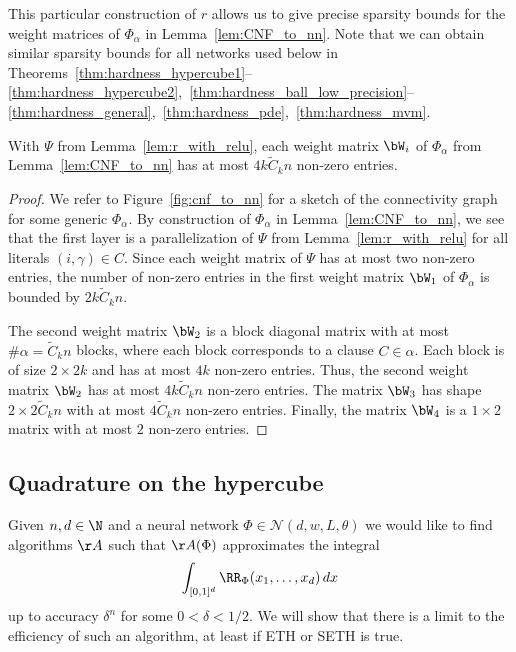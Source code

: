 \documentclass{amsart}[11pt]
\numberwithin{equation}{section}
\newcommand{\nn}{\mathcal{N}}
\newcommand{\card}{\#}
\numberwithin{theorem}{section}
\begin{document}
This particular construction of $r$ allows us to give precise sparsity bounds for the weight matrices of $\Phi_\alpha$ in Lemma~\ref{lem:CNF_to_nn}.
Note that we can obtain similar sparsity bounds for all networks used below in Theorems~\ref{thm:hardness_hypercube1}--\ref{thm:hardness_hypercube2},~\ref{thm:hardness_ball_low_precision}--\ref{thm:hardness_general},~\ref{thm:hardness_pde},~\ref{thm:hardness_mvm}.
\begin{proposition}\label{prop:sparsity}
With $\Psi$ from Lemma~\ref{lem:r_with_relu}, each weight matrix $\bW_i$ of $\Phi_\alpha$ from Lemma~\ref{lem:CNF_to_nn} has at most $4k \widetilde C_k n$ non-zero entries.
\end{proposition}
\begin{proof}
    We refer to Figure~\ref{fig:cnf_to_nn} for a sketch of the connectivity graph for some generic $\Phi_\alpha$.
By construction of $\Phi_\alpha$ in Lemma~\ref{lem:CNF_to_nn}, we see that the first layer is a parallelization of $\Psi$ from Lemma~\ref{lem:r_with_relu} for all literals $(i, \gamma) \in C$. Since each weight matrix of $\Psi$ has at most two non-zero entries, the number of non-zero entries in the first weight matrix $\bW_1$ of $\Phi_\alpha$ is bounded by $2k \widetilde{C}_k n$. 

The second weight matrix $\bW_2$ is a block diagonal matrix with at most $\card \alpha = \widetilde C_k n$ blocks, where each block corresponds to a clause $C\in\alpha$. Each block is of size $2 \times 2k$ and has at most $4k$ non-zero entries. Thus, the second weight matrix $\bW_2$ has at most $4k \widetilde C_k n$ non-zero entries.
The matrix $\bW_3$ has shape $2 \times 2 \widetilde C_k n$ with at most $4\widetilde C_k n$ non-zero entries. 
Finally, the matrix $\bW_4$ is a $1 \times 2$ matrix with at most $2$ non-zero entries.
\end{proof}

\subsection{Quadrature on the hypercube}\label{sec:quadrature_hypercube}
Given $n, d \in \N$ and a neural network $\Phi \in \nn(d, w, L, \theta)$ we would like to find algorithms $\AA$ such that $\AA(\Phi)$ approximates the integral
\begin{align}\label{eq:hypercub_ground_truth}
    \int_{[0,1]^{d}} \RR_\Phi(x_1, \ldots, x_{d})\,dx
\end{align}
up to accuracy $\delta^n$ for some $0<\delta<1/2$.
We will show that there is a limit to the efficiency of such an algorithm, at least if ETH or SETH is true.
\end{document}
